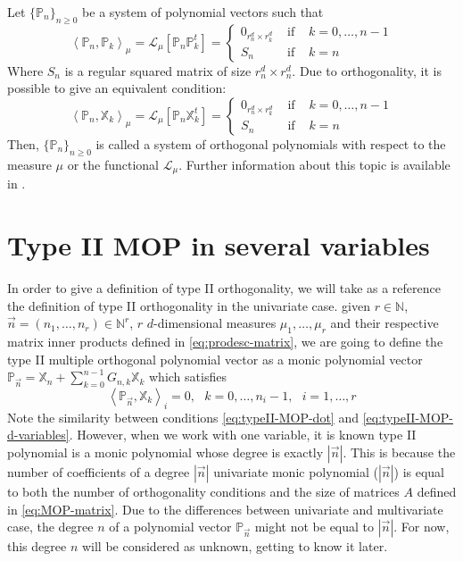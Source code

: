 \documentclass[12pt,a4]{article}
\theoremstyle{plain}
\newcommand{\N}[0]{\mathbb{N}}
\newcommand{\prodesc}[2]{\left\langle #1 , #2 \right\rangle}
\begin{document}
Let $\{\mathbb{P}_n\}_{n\geq 0}$ be a system of polynomial vectors such that
$$
\prodesc{\mathbb P_n}{\mathbb P_k}_\mu = \mathcal{L}_\mu[\mathbb P_n \mathbb P_k^t]= \left\{\begin{array}{ccl}
    0_{r_n^d\times r_k^d} &   \text{ if } & k=0,\dots,n-1 \\
    S_n & \text{ if } & k=n      
\end{array}\right. 
$$
Where $S_n$ is a regular squared matrix of size $r_n^d\times r_n^d$.
Due to orthogonality, it is possible to give an equivalent condition:
\begin{equation}
    \label{eq:prodesc-matrix-PX}
    \prodesc{\mathbb P_n}{\mathbb X_k}_\mu = \mathcal{L}_\mu[\mathbb P_n \mathbb X_k^t]= \left\{\begin{array}{ccl}
        0_{r_n^d\times r_k^d} &   \text{ if } & k=0,\dots,n-1 \\
        S_n & \text{ if } & k=n      
    \end{array}\right. 
\end{equation}
Then, $\{\mathbb{P}_n\}_{n\geq 0}$ is called a system of orthogonal polynomials with respect to the measure $\mu$ or the functional $\mathcal L_\mu$. Further information about this topic is available in \cite[Ch. III, Section 3.2]{dunkl_xu_2014}.

\section{Type II MOP in several variables}

In order to give a definition of type II orthogonality, we will take as a reference the definition of type II orthogonality in the univariate case. given $r\in\N$, $\vec n = (n_1,\dots, n_r)\in\N^r$, $r$ $d$-dimensional measures $\mu_1, \dots, \mu_r$ and their respective matrix inner products defined in \eqref{eq:prodesc-matrix}, we are going to define the type II multiple orthogonal polynomial vector as a monic polynomial vector $\mathbb P_{\vec n} = \mathbb X_n + \displaystyle\sum_{k=0}^{n-1}G_{n,k} \mathbb X_k$ which satisfies
\begin{equation}
    \label{eq:typeII-MOP-d-variables}
    \prodesc{\mathbb P_{\vec n}}{\mathbb X_k}_i = 0, \ \ \ k=0,\dots,n_i-1, \ \ \ i=1,\dots,r
\end{equation}
Note the similarity between conditions \eqref{eq:typeII-MOP-dot} and \eqref{eq:typeII-MOP-d-variables}. However, when we work with one variable, it is known type II polynomial is a monic polynomial whose degree is exactly $|\vec n|$. This is because the number of coefficients of a degree $|\vec n|$ univariate monic polynomial ($|\vec n|$) is equal to both the number of orthogonality conditions and the size of matrices $A$ defined in \eqref{eq:MOP-matrix}. Due to the differences between univariate and multivariate case, the degree $n$ of a polynomial vector $\mathbb P_{\vec n}$ might not be equal to $|\vec n|$. For now, this degree $n$ will be considered as unknown, getting to know it later.
\end{document}
